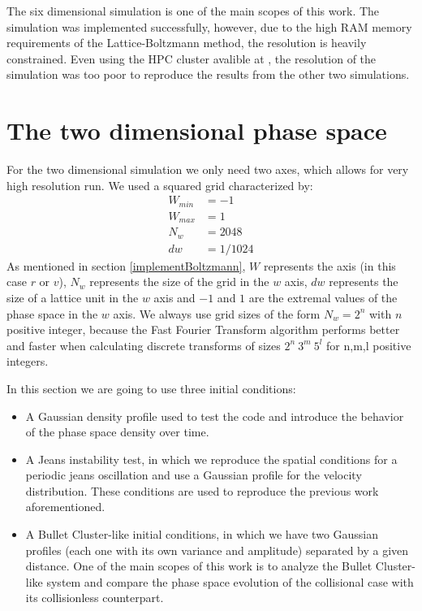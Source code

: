 The six dimensional simulation is one of the main scopes of this work. The simulation was implemented successfully, however, due to the high RAM memory requirements of the Lattice-Boltzmann method, the resolution is heavily constrained. Even using the HPC cluster avalible at , the resolution of the simulation was too poor to reproduce the results from the other two simulations.

\section{The two dimensional phase space}

For the two dimensional simulation we only need two axes, which allows for very high resolution run. We used a squared grid characterized by:
\begin{align}
W_{min} &= -1\\
W_{max} &= 1\\
N_w &= 2048\\
dw &= 1/1024
\end{align}
As mentioned in section \ref{implementBoltzmann}, $W$ represents the axis (in this case $r$ or $v$), $N_w$ represents the size of the grid in the $w$ axis, $dw$ represents the size of a lattice unit in the $w$ axis and $-1$ and $1$ are the extremal values of the phase space in the $w$ axis.
We always use grid sizes of the form $N_w = 2^n$ with $n$ positive integer, because the Fast Fourier Transform algorithm performs better and faster when calculating discrete transforms of sizes $2^n \ 3^m \ 5^l$ for n,m,l positive integers.%

In this section we are going to use three initial conditions:
\begin{itemize}
\item A Gaussian density profile used to test the code and introduce the behavior of the phase space density over time.
\item A Jeans instability test, in which we reproduce the spatial conditions for a periodic jeans oscillation and use a Gaussian profile for the velocity distribution. These conditions are used to reproduce the previous work aforementioned. 
\item A Bullet Cluster-like initial conditions, in which we have two Gaussian profiles (each one with its own variance and amplitude) separated by a given distance. One of the main scopes of this work is to analyze the Bullet Cluster-like system and compare the phase space evolution of the collisional case with its collisionless counterpart.
\end{itemize}
